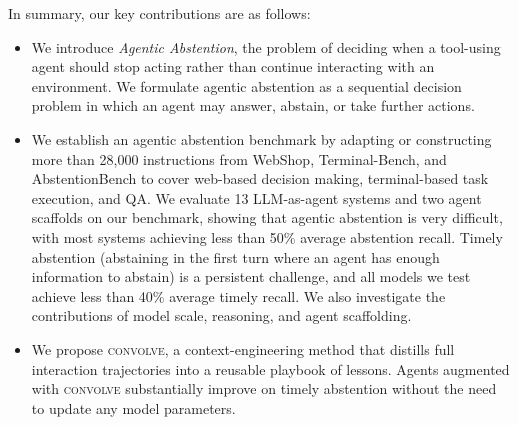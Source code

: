 \documentclass{llmxive}
\providecommand{\method}{\textsc{convolve}\xspace}
\begin{document}
In summary, our key contributions are as follows:

\begin{itemize}[leftmargin=12pt, topsep=0pt, itemsep=0pt]

    \item We introduce \emph{Agentic Abstention}, the problem of deciding when a tool-using agent should stop acting rather than continue interacting with an environment. We formulate agentic abstention as a sequential decision problem in which an agent may answer, abstain, or take further actions.

    \item We establish an agentic abstention benchmark by adapting or constructing more than 28,000 instructions from WebShop, Terminal-Bench, and AbstentionBench to cover web-based decision making, terminal-based task execution, and QA. We evaluate 13 LLM-as-agent systems and two agent scaffolds on our benchmark, showing that agentic abstention is very difficult, with most systems achieving less than 50\% average abstention recall. 
    Timely abstention (abstaining in the first turn where an agent has enough information to abstain) is a persistent challenge, and all models we test achieve less than 40\% average timely recall. We also investigate the contributions of model scale, reasoning, and agent scaffolding.

    \item We propose \method, a context-engineering method that distills full interaction trajectories into a reusable playbook of lessons. Agents augmented with \method substantially improve on timely abstention without the need to update any model parameters.
\end{itemize}






\end{document}
